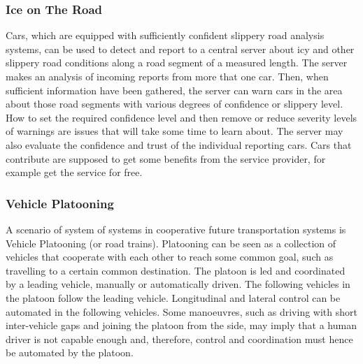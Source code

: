 \subsubsection{Ice on The Road}
Cars, which are equipped with sufficiently confident slippery road analysis systems, can be used to detect and report to a central server about icy and other slippery road conditions along a road segment of a measured length. The server makes an analysis of incoming reports from more that one car. Then, when sufficient information have been gathered, the server can warn cars in the area about those road segments with various degrees of confidence or slippery level. How to set the required confidence level and then remove or reduce severity levels of warnings are issues that will take some time to learn about. The server may also evaluate the confidence and trust of the individual reporting cars. Cars that contribute are supposed to get some benefits from the service provider, for example get the service for free.

\subsubsection{Vehicle Platooning}

A scenario of system of systems in cooperative future transportation systems is Vehicle Platooning (or road trains). Platooning can be seen as a collection of vehicles that cooperate with each other to reach some common goal, such as travelling to a certain common destination. The platoon is led and coordinated by a leading vehicle, manually or automatically driven. The following vehicles in the platoon follow the leading vehicle. Longitudinal and lateral control can be automated in the following vehicles. Some manoeuvres, such as driving with short inter-vehicle gaps and joining the platoon from the side, may imply that a human driver is not capable enough and, therefore, control and coordination must hence be automated by the platoon. 

